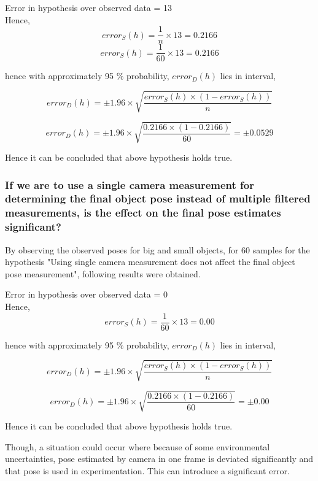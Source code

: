 \vspace{0.5cm}


Error in hypothesis over observed data = 13
\\
Hence,
\\
$$error_{S}(h) = \frac{1}{n} \times 13 = 0.2166$$
$$error_{S}(h) = \frac{1}{60} \times 13 = 0.2166$$

hence with approximately 95 $\%$ probability,
$error_{D}(h)$ lies in interval,

$$error_{D}(h) = \pm 1.96 \times \sqrt{\frac{error_{S}(h) \times (1 - error_{S}(h))}{n}} $$

$$error_{D}(h) = \pm 1.96 \times \sqrt{\frac{0.2166 \times (1 - 0.2166)}{60}} = \pm 0.0529$$

Hence it can be concluded that above hypothesis holds true. 



\subsubsection{If we are to use a single camera measurement for determining the final object pose instead of multiple filtered measurements, is the effect on the final pose estimates significant?}

By observing the observed poses for big and small objects, for 60 samples for the hypothesis "Using single camera measurement does not affect the final object pose measurement", following results were obtained.

\vspace{0.5cm}

Error in hypothesis over observed data = 0
\\
Hence,
\\
$$error_{S}(h) = \frac{1}{60} \times 13 = 0.00$$

hence with approximately 95 $\%$ probability,
$error_{D}(h)$ lies in interval,

$$error_{D}(h) = \pm 1.96 \times \sqrt{\frac{error_{S}(h) \times (1 - error_{S}(h))}{n}} $$

$$error_{D}(h) = \pm 1.96 \times \sqrt{\frac{0.2166 \times (1 - 0.2166)}{60}} = \pm 0.00$$

Hence it can be concluded that above hypothesis holds true. 

Though, a situation could occur where because of some environmental uncertainties, pose estimated by camera in one frame is deviated significantly and that pose is used in experimentation. This can introduce a significant error. 

